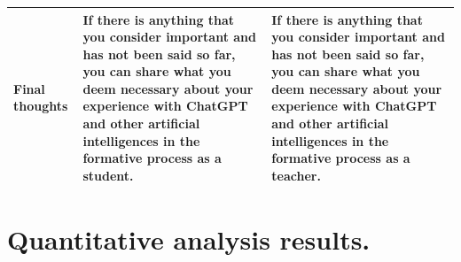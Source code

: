 \documentclass[english]{textolivre}
\begin{document}
\begin{table}[h]
\begin{tabularx}{\textwidth}{p{2.5cm} X X}
Final thoughts
&
If there is anything that you consider important and has not been said so far, you can share what you deem necessary about your experience with ChatGPT and other artificial intelligences in the formative process as a student.
&
If there is anything that you consider important and has not been said so far, you can share what you deem necessary about your experience with ChatGPT and other artificial intelligences in the formative process as a teacher.
\\
\bottomrule
\end{tabularx}
\end{table}


\newpage
\section{Quantitative analysis results.}\label{apx-longtable2}
\end{document}
